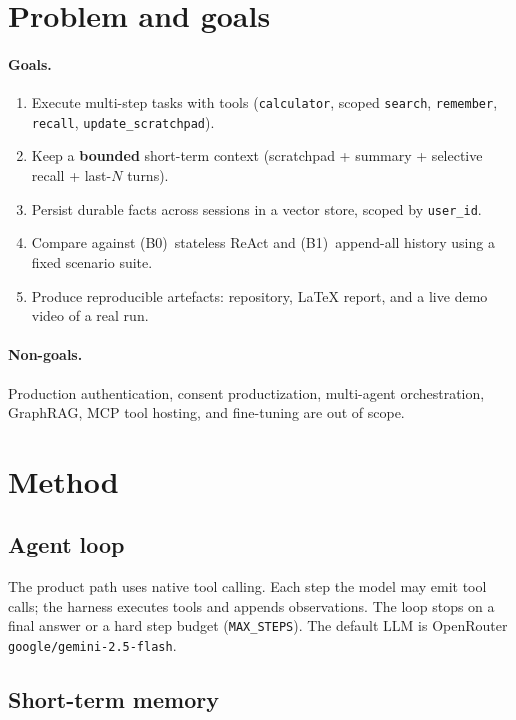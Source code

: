 \documentclass[11pt,a4paper]{article}
\begin{document}
\section{Problem and goals}

\paragraph{Goals.}
\begin{enumerate}[leftmargin=*]
  \item Execute multi-step tasks with tools (\texttt{calculator}, scoped \texttt{search}, \texttt{remember}, \texttt{recall}, \texttt{update\_scratchpad}).
  \item Keep a \textbf{bounded} short-term context (scratchpad + summary + selective recall + last-\(N\) turns).
  \item Persist durable facts across sessions in a vector store, scoped by \texttt{user\_id}.
  \item Compare against (B0)~stateless ReAct and (B1)~append-all history using a fixed scenario suite.
  \item Produce reproducible artefacts: repository, LaTeX report, and a live demo video of a real run.
\end{enumerate}

\paragraph{Non-goals.}
Production authentication, consent productization, multi-agent orchestration, GraphRAG, MCP tool hosting, and fine-tuning are out of scope.

\section{Method}

\subsection{Agent loop}

The product path uses native tool calling. Each step the model may emit tool calls; the harness executes tools and appends observations. The loop stops on a final answer or a hard step budget (\texttt{MAX\_STEPS}). The default LLM is OpenRouter \texttt{google/gemini-2.5-flash}.

\subsection{Short-term memory}
\end{document}

